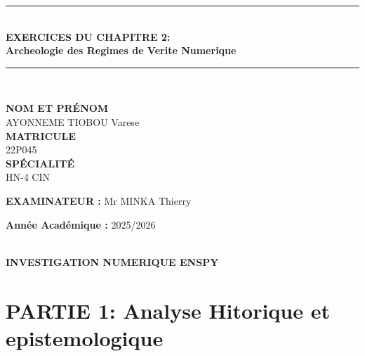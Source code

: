 \documentclass[12pt, a4em]{article}
\begin{document}
\begin{titlepage}
		\vspace{2cm}
		\begin{center}
			\rule{14cm}{1pt} \\[0.1cm]
			{\Large \bfseries EXERCICES DU CHAPITRE 2: \\Archeologie des Regimes de Verite Numerique} \\[0.0001cm] 
			\rule{14cm}{1pt} \\[2cm]
		\end{center}
		
		\begin{center}
			\textbf{NOM ET PRÉNOM}\\
			AYONNEME TIOBOU Varese\\[0.5cm]
			\textbf{MATRICULE}\\
			22P045\\[0.5cm]
			\textbf{SPÉCIALITÉ}\\
			HN-4 CIN
		\end{center}
		
		\vspace{2cm}
		
		\begin{flushleft}
			\textbf{EXAMINATEUR :} Mr MINKA Thierry
		\end{flushleft}
		
		\begin{flushright}
			\textbf{Année Académique :} 2025/2026
		\end{flushright}
		
		\vfill
		
		\begin{center}
			\\[0.05cm]
			\textbf{\color{black}INVESTIGATION NUMERIQUE \hspace{1cm}  \hspace{5cm} ENSPY}
		\end{center}
	\end{titlepage}
	
	
	\tableofcontents
	\pagebreak

	\part*{PARTIE 1: Analyse Hitorique et epistemologique}
	
\end{document}
